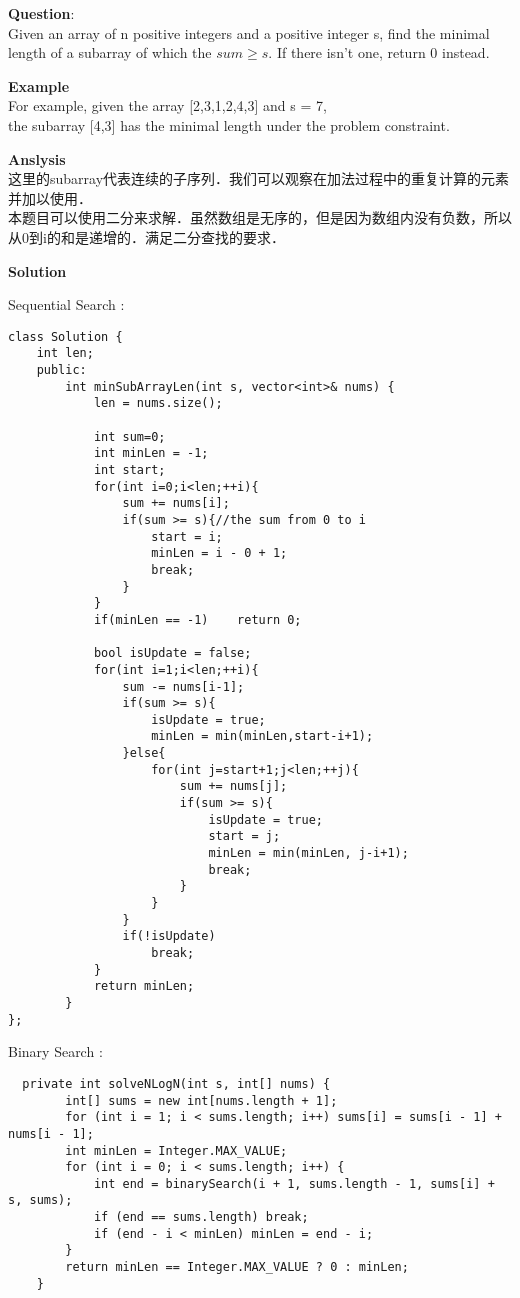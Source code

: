     
\begin{description}
    \item{\textbf{Question}}:\\%
		Given an array of n positive integers and a positive integer s, find the minimal length of a subarray of which the $sum \ge s$. If there isn't one, return 0 instead.\\


    \item{\textbf{Example}}\\
		For example, given the array [2,3,1,2,4,3] and s = 7,\\
		the subarray [4,3] has the minimal length under the problem constraint.\\
    \item{\textbf{Anslysis}}\\
		这里的subarray代表连续的子序列．我们可以观察在加法过程中的重复计算的元素并加以使用．\\
		本题目可以使用二分来求解．虽然数组是无序的，但是因为数组内没有负数，所以从0到i的和是递增的．满足二分查找的要求．\\

    \item{\textbf{Solution}}\\
	\item{Sequential Search} : \\
		\begin{lstlisting}
class Solution {
	int len;
	public:
		int minSubArrayLen(int s, vector<int>& nums) {
			len = nums.size();

			int sum=0;
			int minLen = -1;
			int start;
			for(int i=0;i<len;++i){
				sum += nums[i];
				if(sum >= s){//the sum from 0 to i
					start = i;
					minLen = i - 0 + 1;
					break;
				}
			}
			if(minLen == -1)	return 0;

			bool isUpdate = false;
			for(int i=1;i<len;++i){
				sum -= nums[i-1];
				if(sum >= s){
					isUpdate = true;
					minLen = min(minLen,start-i+1);
				}else{
					for(int j=start+1;j<len;++j){
						sum += nums[j];
						if(sum >= s){
							isUpdate = true;
							start = j;
							minLen = min(minLen, j-i+1);
							break;
						}
					}
				}
				if(!isUpdate)
					break;
			}
			return minLen;
		}
};
		\end{lstlisting}


	\item{Binary Search} : \\
		\begin{lstlisting}
  private int solveNLogN(int s, int[] nums) {
        int[] sums = new int[nums.length + 1];
        for (int i = 1; i < sums.length; i++) sums[i] = sums[i - 1] + nums[i - 1];
        int minLen = Integer.MAX_VALUE;
        for (int i = 0; i < sums.length; i++) {
            int end = binarySearch(i + 1, sums.length - 1, sums[i] + s, sums);
            if (end == sums.length) break;
            if (end - i < minLen) minLen = end - i;
        }
        return minLen == Integer.MAX_VALUE ? 0 : minLen;
    }


\end{lstlisting}
\end{description}
